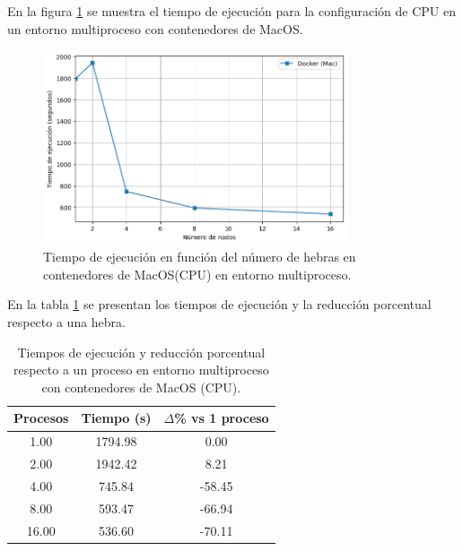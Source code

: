 En la figura \ref{fig:multi-node_mac_docker_time} se muestra el tiempo de ejecución para la configuración de CPU en un entorno multiproceso con contenedores de MacOS.

\begin{figure}[ht]
    \centering
    \includegraphics[width=0.8\textwidth]{imagenes/cap5/multi-node_mac_docker_time.png}
    \caption{Tiempo de ejecución en función del número de hebras en contenedores de MacOS(CPU) en entorno multiproceso.}
    \label{fig:multi-node_mac_docker_time}
\end{figure}

En la tabla \ref{tab:multi-node_mac_docker} se presentan los tiempos de ejecución y la reducción porcentual respecto a una hebra.

\begin{table}[ht]
    \centering
    \begin{tabular}{|c|c|c|}
        \hline
        \textbf{Procesos} & \textbf{Tiempo (s)} & \textbf{$\Delta$\% vs 1 proceso} \\
        \hline
        1.00              & 1794.98             & 0.00                             \\
        2.00              & 1942.42             & 8.21                             \\
        4.00              & 745.84              & -58.45                           \\
        8.00              & 593.47              & -66.94                           \\
        16.00             & 536.60              & -70.11                           \\
        \hline
    \end{tabular}
    \caption{Tiempos de ejecución y reducción porcentual respecto a un proceso en entorno multiproceso con contenedores de MacOS (CPU).}
    \label{tab:multi-node_mac_docker}
\end{table}

